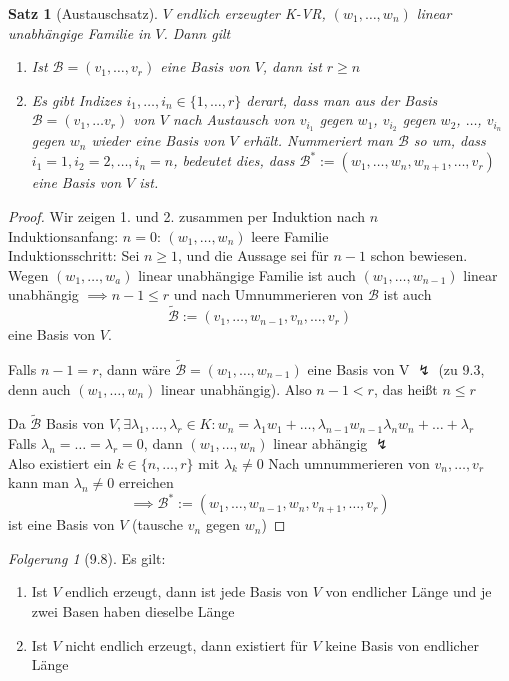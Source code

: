 \documentclass[a4paper]{scrartcl}
\DeclareMathOperator{\Exists}{\exists}
\theoremstyle{definition}
\theoremstyle{plain}
\newtheorem{thm}{Satz}
\theoremstyle{plain}
\theoremstyle{remark}
\theoremstyle{remark}
\theoremstyle{remark}
\newtheorem{conc}{Folgerung}
\theoremstyle{remark}
\theoremstyle{remark}
\begin{document}
\begin{thm}[Austauschsatz]
$V$ endlich erzeugter K-VR, $(w_1, \ldots, w_n)$ linear unabhängige Familie in $V$. Dann gilt
\begin{enumerate}
\item Ist $\mathcal{B} = (v_1, \ldots, v_r)$ eine Basis von $V$, dann ist $r \geq n$
\item Es gibt Indizes $i_1, \ldots, i_n \in \{1, \ldots, r\}$ derart, dass man aus der Basis $\mathcal{B} = (v_1, \ldots v_r)$ von $V$ nach Austausch von $v_{i_1}$ gegen $w_1$, $v_{i_2}$ gegen $w_2$, $\ldots$, $v_{i_n}$ gegen $w_n$ wieder eine Basis von $V$ erhält.
Nummeriert man $\mathcal{B}$ so um, dass $i_1 = 1, i_2 = 2, \ldots, i_n = n$, bedeutet dies, dass $\mathcal{B}^\ast :=(w_1, \ldots, w_n, w_{n + 1}, \ldots, v_r)$ eine Basis von $V$ ist.
\end{enumerate}
\end{thm}
\begin{proof}
Wir zeigen 1. und 2. zusammen per Induktion nach $n$ \\
  Induktionsanfang: $n = 0$: $(w_1, \ldots, w_n)$ leere Familie \\
  Induktionsschritt: Sei $n \geq 1$, und die Aussage sei für $n - 1$ schon bewiesen. Wegen $(w_1, \ldots, w_a)$ linear unabhängige Familie ist auch $(w_1, \ldots, w_{n - 1})$ linear unabhängig $\implies n - 1 \leq r$ und nach Umnummerieren von $\mathcal{B}$ ist auch
\[\tilde{\mathcal{B}} := (v_1, \ldots, w_{n - 1}, v_n, \ldots, v_r)\]
eine Basis von $V$.

Falls $n - 1 = r$, dann wäre $\tilde{\mathcal{B}} = (w_1, \ldots, w_{n - 1})$ eine Basis von V $\lightning$ (zu 9.3, denn auch $(w_1, \ldots, w_n)$ linear unabhängig).
Also $n - 1 < r$, das heißt $n \leq r$

Da $\tilde{\mathcal{B}}$ Basis von $V, \Exists \lambda_1, \ldots, \lambda_r \in K: w_n = \lambda_1 w_1 + \ldots, \lambda_{n - 1} w_{n - 1} \lambda_n w_n + \ldots + \lambda_r$ \\
  Falls $\lambda_n = \ldots = \lambda_r = 0$, dann $(w_1, \ldots, w_n)$ linear abhängig $\lightning$ \\
  Also existiert ein $k \in \{n, \ldots, r\}$ mit $\lambda_k \neq 0$ Nach umnummerieren von $v_n, \ldots, v_r$ kann man $\lambda_n \neq 0$ erreichen
\[\implies \mathcal{B}^\ast := (w_1, \ldots, w_{n - 1}, w _n, v_{n + 1}, \ldots, v_r)\] ist eine Basis von $V$ (tausche $v_n$ gegen $w_n$)
\end{proof}
\begin{conc}[9.8]
Es gilt:
\begin{enumerate}
\item Ist $V$ endlich erzeugt, dann ist jede Basis von $V$ von endlicher Länge und je zwei Basen haben dieselbe Länge
\item Ist $V$ nicht endlich erzeugt, dann existiert für $V$ keine Basis von endlicher Länge
\end{enumerate}
\end{conc}
\end{document}
